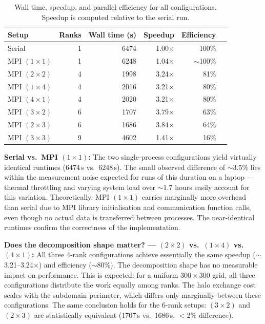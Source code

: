 \documentclass[11pt, a4paper]{article}
\begin{document}
\begin{table}[htbp]
    \centering
    \caption{Wall time, speedup, and parallel efficiency for all configurations.
             Speedup is computed relative to the serial run.}
    \label{tab:runtime}
    \begin{tabular}{lrrrrr}
        \toprule
        Setup & Ranks & Wall time (s) & Speedup & Efficiency \\
        \midrule
        Serial          & 1 & 6474 & 1.00$\times$ & 100\%  \\
        MPI $(1\times1)$& 1 & 6248 & 1.04$\times$ & $\sim$100\% \\
        MPI $(2\times2)$& 4 & 1998 & 3.24$\times$ & 81\%   \\
        MPI $(1\times4)$& 4 & 2016 & 3.21$\times$ & 80\%   \\
        MPI $(4\times1)$& 4 & 2020 & 3.21$\times$ & 80\%   \\
        MPI $(3\times2)$& 6 & 1707 & 3.79$\times$ & 63\%   \\
        MPI $(2\times3)$& 6 & 1686 & 3.84$\times$ & 64\%   \\
        MPI $(3\times3)$& 9 & 4602 & 1.41$\times$ & 16\%   \\
        \bottomrule
    \end{tabular}
\end{table}

\textbf{Serial vs.\ MPI $(1\times1)$:} The two single-process configurations
yield virtually identical runtimes (6474\,s vs.\ 6248\,s). The small observed
difference of $\sim$3.5\% lies within the measurement noise expected for runs of
this duration on a laptop --- thermal throttling and varying system load over
$\sim$1.7 hours easily account for this variation. Theoretically, MPI
$(1\times1)$ carries marginally more overhead than serial due to MPI library
initialisation and communication function calls, even though no actual data is
transferred between processes. The near-identical runtimes confirm the
correctness of the implementation.

\textbf{Does the decomposition shape matter? --- $(2\times2)$ vs.\ $(1\times4)$
vs.\ $(4\times1)$:} All three 4-rank configurations achieve essentially the same
speedup ($\sim$3.21--3.24$\times$) and efficiency ($\sim$80\%). The
decomposition shape has no measurable impact on performance. This is expected:
for a uniform $300\times300$ grid, all three configurations distribute the work
equally among ranks. The halo exchange cost scales with the subdomain perimeter,
which differs only marginally between these configurations. The same conclusion
holds for the 6-rank setups: $(3\times2)$ and $(2\times3)$ are statistically
equivalent (1707\,s vs.\ 1686\,s, $<$2\% difference).
\end{document}
